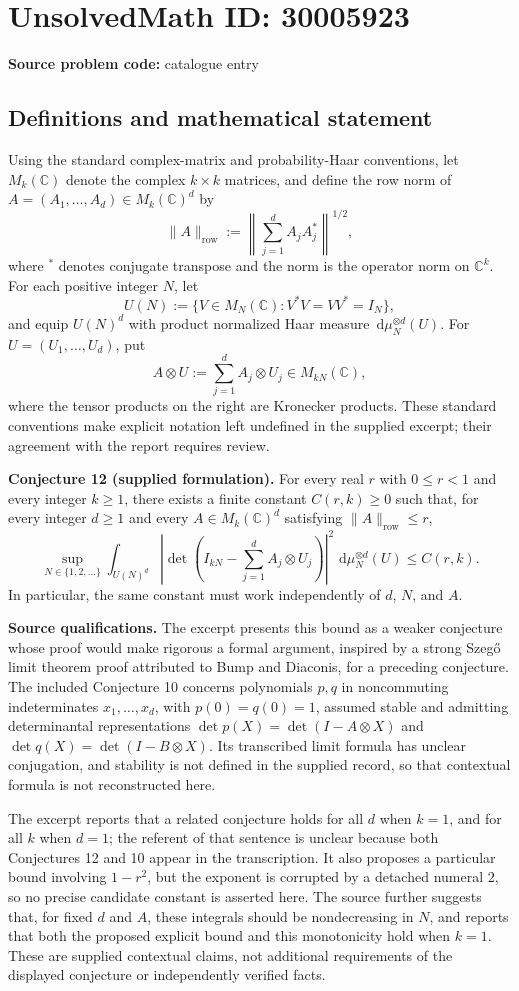 \documentclass[11pt]{article}
\newcommand{\C}{\mathbb{C}}
\newcommand{\dd}{\,\mathrm{d}}
\begin{document}
\section*{UnsolvedMath ID: 30005923}
\textbf{Source problem code:} catalogue entry
\subsection{Definitions and mathematical statement}
Using the standard complex-matrix and probability-Haar conventions, let \(M_k(\C)\) denote the complex \(k\times k\) matrices, and define the row norm of \(A=(A_1,\ldots,A_d)\in M_k(\C)^d\) by
\[
\|A\|_{\mathrm{row}}:=\left\|\sum_{j=1}^d A_jA_j^*\right\|^{1/2},
\]
where \(^*\) denotes conjugate transpose and the norm is the operator norm on \(\C^k\). For each positive integer \(N\), let
\[
U(N):=\{V\in M_N(\C):V^*V=VV^*=I_N\},
\]
and equip \(U(N)^d\) with product normalized Haar measure \(\dd\mu_N^{\otimes d}(U)\). For \(U=(U_1,\ldots,U_d)\), put
\[
A\otimes U:=\sum_{j=1}^d A_j\otimes U_j\in M_{kN}(\C),
\]
where the tensor products on the right are Kronecker products. These standard conventions make explicit notation left undefined in the supplied excerpt; their agreement with the report requires review.

\textbf{Conjecture 12 (supplied formulation).} For every real \(r\) with \(0\le r<1\) and every integer \(k\ge1\), there exists a finite constant \(C(r,k)\ge0\) such that, for every integer \(d\ge1\) and every \(A\in M_k(\C)^d\) satisfying \(\|A\|_{\mathrm{row}}\le r\),
\[
\sup_{N\in\{1,2,\ldots\}}
\int_{U(N)^d}
\left|\det\!\left(I_{kN}-\sum_{j=1}^d A_j\otimes U_j\right)\right|^2
\,\dd\mu_N^{\otimes d}(U)
\le C(r,k).
\]
In particular, the same constant must work independently of \(d\), \(N\), and \(A\).

\textbf{Source qualifications.} The excerpt presents this bound as a weaker conjecture whose proof would make rigorous a formal argument, inspired by a strong Szeg\H{o} limit theorem proof attributed to Bump and Diaconis, for a preceding conjecture. The included Conjecture 10 concerns polynomials \(p,q\) in noncommuting indeterminates \(x_1,\ldots,x_d\), with \(p(0)=q(0)=1\), assumed stable and admitting determinantal representations \(\det p(X)=\det(I-A\otimes X)\) and \(\det q(X)=\det(I-B\otimes X)\). Its transcribed limit formula has unclear conjugation, and stability is not defined in the supplied record, so that contextual formula is not reconstructed here.

The excerpt reports that a related conjecture holds for all \(d\) when \(k=1\), and for all \(k\) when \(d=1\); the referent of that sentence is unclear because both Conjectures 12 and 10 appear in the transcription. It also proposes a particular bound involving \(1-r^2\), but the exponent is corrupted by a detached numeral \(2\), so no precise candidate constant is asserted here. The source further suggests that, for fixed \(d\) and \(A\), these integrals should be nondecreasing in \(N\), and reports that both the proposed explicit bound and this monotonicity hold when \(k=1\). These are supplied contextual claims, not additional requirements of the displayed conjecture or independently verified facts.
\end{document}
